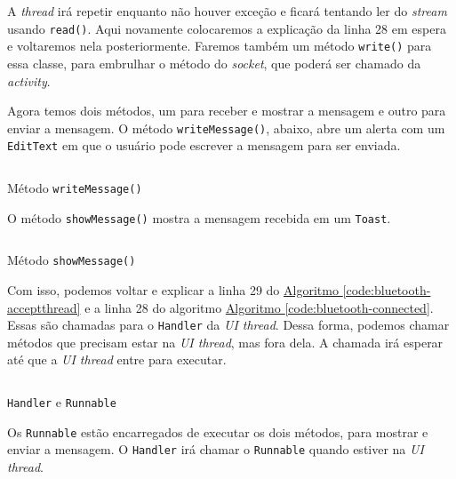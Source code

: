 \documentclass[a4paper,12pt,brazil,oneside]{book}
\begin{document}
\begin{singlespace}
	A \emph{thread} irá repetir enquanto não houver exceção e ficará tentando ler do \emph{stream} usando \texttt{read()}. Aqui novamente colocaremos a explicação da linha 28 em espera e voltaremos nela posteriormente. Faremos também um método \texttt{write()} para essa classe, para embrulhar o método do \emph{socket}, que poderá ser chamado da \emph{activity}.

	Agora temos dois métodos, um para receber e mostrar a mensagem e outro para enviar a mensagem. O método \texttt{writeMessage()}, abaixo, abre um alerta com um \texttt{EditText} em que o usuário pode escrever a mensagem para ser enviada.

	\begin{listing}[H]
	\inputminted[linenos=true,fontsize=\small,frame=lines, framesep=2mm, tabsize=2,numbersep=5pt]{java}{src/api/bluetooth/writemessage.java}
	\caption{Método \texttt{writeMessage()}}
	\label{code:bluetooth-writemessage}
	\end{listing} 	
	 
	O método \texttt{showMessage()} mostra a mensagem recebida em um \texttt{Toast}.

	\begin{listing}[H]
	\inputminted[linenos=true,fontsize=\small,frame=lines, framesep=2mm, tabsize=2,numbersep=5pt]{java}{src/api/bluetooth/showmessage.java}
	\caption{Método \texttt{showMessage()}}
	\label{code:bluetooth-showmessage}
	\end{listing} 	

	Com isso, podemos voltar e explicar a linha 29 do \hyperref[code:bluetooth-acceptthread]{Algoritmo \ref*{code:bluetooth-acceptthread}} e a linha 28 do algoritmo \hyperref[code:bluetooth-connected]{Algoritmo \ref*{code:bluetooth-connected}}. Essas são chamadas para o \texttt{Handler} da \emph{UI thread}. Dessa forma, podemos chamar métodos que precisam estar na \emph{UI thread}, mas fora dela. A chamada irá esperar até que a \emph{UI thread} entre para executar.

	\begin{listing}[H]
	\inputminted[linenos=true,fontsize=\small,frame=lines, framesep=2mm, tabsize=2,numbersep=5pt]{java}{src/api/bluetooth/handler.java}
	\caption{\texttt{Handler} e \texttt{Runnable}}
	\label{code:bluetooth-handler}
	\end{listing} 	

	Os \texttt{Runnable} estão encarregados de executar os dois métodos, para mostrar e enviar a mensagem. O \texttt{Handler} irá chamar o \texttt{Runnable} quando estiver na \emph{UI thread}.


\end{singlespace}
\end{document}
